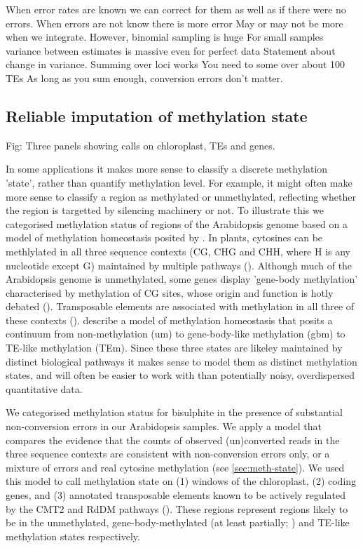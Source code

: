 \documentclass[12pt,longbibliography]{article}
\begin{document}
When error rates are known we can correct for them as well as if there were no errors.
When errors are not know there is more error
May or may not be more when we integrate.
However, binomial sampling is huge
For small samples variance between estimates is massive even for perfect data
Statement about change in variance.
Summing over loci works
You need to some over about 100 TEs
As long as you sum enough, conversion errors don't matter.

\subsection{Reliable imputation of methylation state}

Fig: Three panels showing calls on chloroplast, TEs and genes.

In some applications it makes more sense to classify a discrete methylation 'state', rather than quantify methylation level.
For example, it might often make more sense to classify a region as methylated or unmethylated, reflecting whether the region is targetted by silencing machinery or not.
To illustrate this we categorised methylation status of regions of the Arabidopsis genome based on a model of methylation homeostasis posited by \textcite{zhang2020natural}.
In plants, cytosines can be methlylated in all three sequence contexts (CG, CHG and CHH, where H is any nucleotide except G) maintained by multiple pathways (\cite{law2010establishing}).
Although much of the Arabidopsis genome is unmethylated, some genes display 'gene-body methylation' characterised by methylation of CG sites, whose origin and function is hotly debated (\cite{muyle2022gene}). 
Transposable elements are associated with methylation in all three of these contexts (\cite{cokus2008shotgun, lister2008highly}).
\textcite{zhang2020natural} describe a model of methylation homeostasis that posits a continuum from non-methylation (um) to gene-body-like methylation (gbm) to TE-like methylation (TEm).
Since these three states are likeley maintained by distinct biological pathways it makes sense to model them as distinct methylation states, and will often be easier to work with than potentially noisy, overdispersed quantitative data.

We categorised methylation status for bisulphite in the presence of substantial non-conversion errors in our Arabidopsis samples.
We apply a model that compares the evidence that the counts of observed (un)converted reads in the three sequence contexts are consistent with non-conversion errors only, or a mixture of errors and real cytosine methylation (see \ref{sec:meth-state}).
We used this model to call methylation state on (1) windows of the chloroplast, (2) coding genes, and (3) annotated transposable elements known to be actively regulated by the CMT2 and RdDM pathways (\cite{stroud2013comprehensive}).
These regions represent regions likely to be in the unmethylated, gene-body-methylated (at least partially; \cite{zhang2020natural}) and TE-like methylation states respectively.
\end{document}
